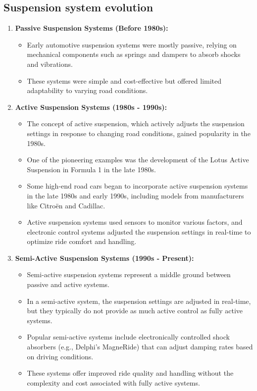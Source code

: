 \subsection{Suspension system evolution}
\begin{enumerate}
	\item \textbf{Passive Suspension Systems (Before 1980s):}
	\begin{itemize}
		\item Early automotive suspension systems were mostly passive, relying on mechanical components such as springs and dampers to absorb shocks and vibrations.
		\item These systems were simple and cost-effective but offered limited adaptability to varying road conditions.
	\end{itemize}
	\item \textbf{Active Suspension Systems (1980s - 1990s):}
	\begin{itemize}
		
		\item The concept of active suspension, which actively adjusts the suspension settings in response to changing road conditions, gained popularity in the 1980s.
		\item One of the pioneering examples was the development of the Lotus Active Suspension in Formula 1 in the late 1980s.
		\item Some high-end road cars began to incorporate active suspension systems in the late 1980s and early 1990s, including models from manufacturers like Citroën and Cadillac.
		\item Active suspension systems used sensors to monitor various factors, and electronic control systems adjusted the suspension settings in real-time to optimize ride comfort and handling.
	\end{itemize}
	
	\item \textbf{Semi-Active Suspension Systems (1990s - Present):}
	\begin{itemize}
		
		\item Semi-active suspension systems represent a middle ground between passive and active systems.
		\item In a semi-active system, the suspension settings are adjusted in real-time, but they typically do not provide as much active control as fully active systems.
		\item Popular semi-active systems include electronically controlled shock absorbers (e.g., Delphi's MagneRide) that can adjust damping rates based on driving conditions.
		\item These systems offer improved ride quality and handling without the complexity and cost associated with fully active systems.
	\end{itemize}
	

\end{enumerate}
